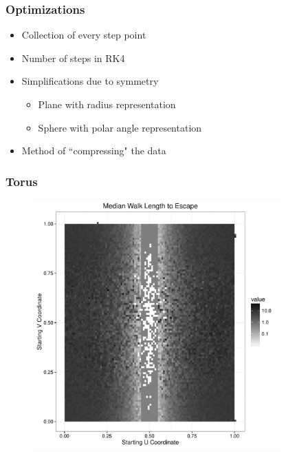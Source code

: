 \documentclass{beamer}
\begin{document}
\begin{frame}
	
	\frametitle{Optimizations}
	
	\begin{itemize}
		\item Collection of every step point
		\item Number of steps in RK4
		\item Simplifications due to symmetry
		\begin{itemize}
			\item Plane with radius representation
			\item Sphere with polar angle representation
		\end{itemize}
		\item Method of ``compressing" the data
	\end{itemize}
	
\end{frame}


\begin{frame}
	
	\frametitle{Torus}
	
	\begin{figure}
		\includegraphics[width=0.85\textwidth]{images/TorusUBand.pdf}
	\end{figure}
	
\end{frame}
\end{document}

